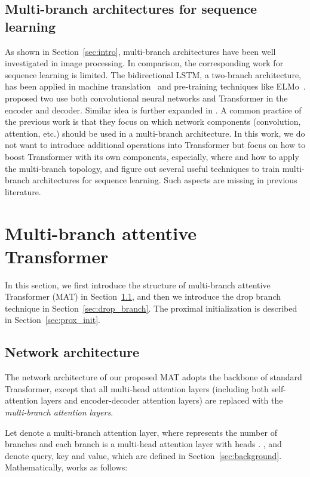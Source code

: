 \documentclass{article}
\begin{document}
\subsection{Multi-branch architectures for sequence learning}
As shown in Section~\ref{sec:intro}, multi-branch architectures have been well investigated in image processing. In comparison, the corresponding work for sequence learning is limited. The bidirectional LSTM, a two-branch architecture, has been applied in machine translation~\cite{zhou2016deep,wu2016google} and pre-training techniques like ELMo~\cite{peters2018elmo}. \cite{song2018double} proposed two use both convolutional neural networks and Transformer in the encoder and decoder. Similar idea is further expanded in \cite{zhao2019muse}. A common practice of the previous work is that they focus on which network components (convolution, attention, etc.) should be used in a multi-branch architecture. In this work, we do not want to introduce additional operations into Transformer but focus on how to boost Transformer with its own components, especially, where and how to apply the multi-branch topology, and figure out several useful techniques to train multi-branch architectures for sequence learning. Such aspects are missing in previous literature.

\section{Multi-branch attentive Transformer}\label{sec:alg}
In this section, we first introduce the structure of multi-branch attentive Transformer (MAT) in Section~\ref{sec:network_arch}, and then we introduce the drop branch technique in Section~\ref{sec:drop_branch}. The proximal initialization is described in Section~\ref{sec:prox_init}. 

\subsection{Network architecture}\label{sec:network_arch}
The network architecture of our proposed MAT adopts the backbone of standard Transformer, except that all multi-head attention layers (including both self-attention layers and encoder-decoder attention layers) are replaced with the {\em multi-branch attention layers}.

Let  denote a multi-branch attention layer, where  represents the number of branches and each branch is a multi-head attention layer with  heads . ,  and  denote query, key and value, which are defined in Section~\ref{sec:background}. Mathematically,  works as follows:
\end{document}
